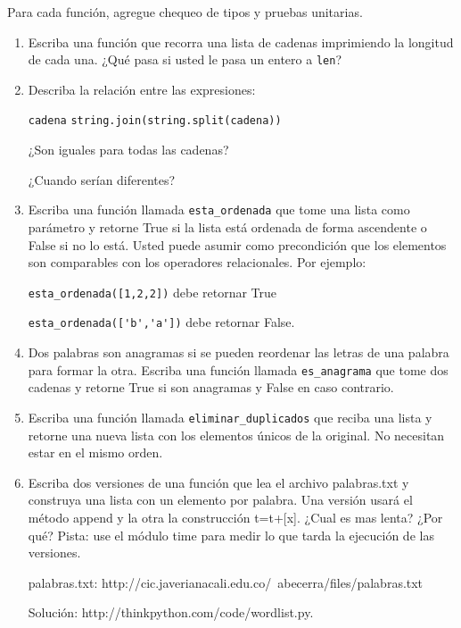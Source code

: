 Para cada función, agregue chequeo de tipos y pruebas unitarias.


\begin{enumerate}

 \item Escriba una función que  recorra una lista de cadenas 
   imprimiendo la longitud de cada una. ¿Qué pasa si usted
   le pasa un entero a  \texttt{len}?

 \item Describa la relación entre las expresiones: 
 
 \texttt{cadena} \hfill  {\tt string.join(string.split(cadena))}
 
 ¿Son iguales para todas las cadenas? 
 
 ¿Cuando serían diferentes?
  
  \item Escriba una función llamada \verb+esta_ordenada+ que tome una lista como parámetro y
  retorne True si la lista está ordenada de forma ascendente o False si no lo está.
  Usted puede asumir como precondición que los elementos son comparables con los 
  operadores relacionales. Por ejemplo: 
  
  \verb+esta_ordenada([1,2,2])+ debe retornar  True 
  
  \verb+esta_ordenada(['b','a'])+ debe retornar False.
  
  \item Dos palabras son anagramas si se pueden reordenar las letras de una palabra para formar
  la otra. Escriba una función llamada \verb+es_anagrama+ que tome dos cadenas y retorne True
  si son anagramas y False en caso contrario.
  
  \item Escriba una función llamada \verb+eliminar_duplicados+ que reciba una lista y retorne 
  una nueva lista con los elementos únicos de la original. No necesitan estar en el mismo 
  orden.
  
  
  \item Escriba dos versiones de una función que lea el archivo palabras.txt y construya una lista 
  con un elemento por palabra. Una versión usará el método append y la otra la construcción t=t+[x]. 
  ¿Cual es mas lenta? ¿Por qué?  Pista: use el módulo time para medir lo que tarda la ejecución 
  de las versiones.  
  
  palabras.txt: 
  http://cic.javerianacali.edu.co/~abecerra/files/palabras.txt
  
  Solución: 
  http://thinkpython.com/code/wordlist.py.


\end{enumerate}
